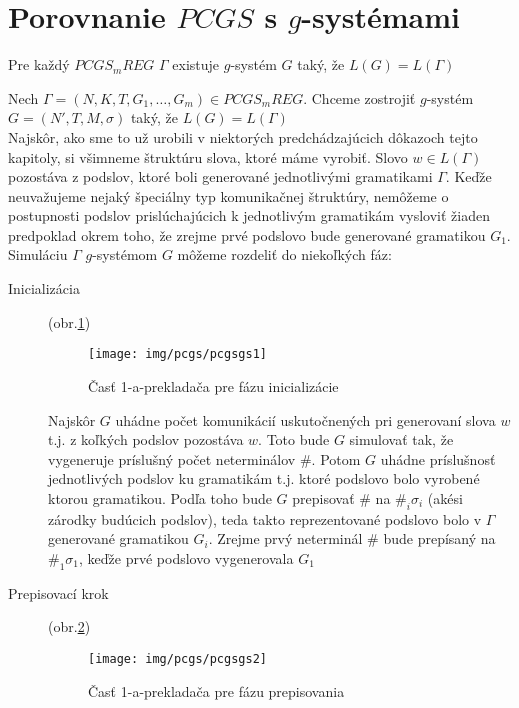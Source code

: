 \section{Porovnanie $PCGS$ s $g$-systémami}

\begin{veta}
Pre každý $PCGS_mREG$ $\Gamma$ existuje $g$-systém $G$ taký, že
$L(G)=L(\Gamma)$
\end{veta}

\begin{dokaz}
Nech $\Gamma=(N,K,T,G_1,\dots ,G_m)\in PCGS_mREG$. Chceme
zostrojiť $g$-systém $G=(N',T,M,\sigma)$ taký, že $L(G)=L(\Gamma)$
\\ Najskôr, ako sme to už urobili v niektorých predchádzajúcich
dôkazoch tejto kapitoly, si všimneme štruktúru slova, ktoré máme
vyrobiť. Slovo $w\in L(\Gamma)$ pozostáva z podslov, ktoré boli
generované jednotlivými gramatikami $\Gamma$. Keďže neuvažujeme
nejaký špeciálny typ komunikačnej štruktúry, nemôžeme o
postupnosti podslov prislúchajúcich k jednotlivým gramatikám
vysloviť žiaden predpoklad okrem toho, že zrejme prvé podslovo
bude generované gramatikou $G_1$.
\\ Simuláciu $\Gamma$ $g$-systémom $G$ môžeme rozdeliť do
niekoľkých fáz:
\begin{description}
  \item[Inicializácia] (obr.\ref{pcgsgs1})

\begin{figure}[ht]
  \centering
  \texttt{[image: img/pcgs/pcgsgs1]}
  \caption{Časť 1-a-prekladača pre fázu inicializácie}\label{pcgsgs1}
\end{figure}

  Najskôr $G$ uhádne počet komunikácií uskutočnených pri
  generovaní slova $w$ t.j. z koľkých podslov pozostáva $w$. Toto
  bude $G$ simulovať tak, že vygeneruje príslušný počet neterminálov $\#$.
  Potom $G$ uhádne príslušnosť jednotlivých podslov ku gramatikám
  t.j. ktoré podslovo bolo vyrobené ktorou gramatikou. Podľa toho
  bude $G$ prepisovať $\#$ na $\#_i\sigma_i$ (akési zárodky budúcich podslov),
  teda takto reprezentované podslovo bolo v $\Gamma$ generované gramatikou
  $G_i$. Zrejme prvý neterminál $\#$ bude prepísaný na $\#_1\sigma_1$, keďže
  prvé podslovo vygenerovala $G_1$

  \item[Prepisovací krok] (obr.\ref{pcgsgs2})
\begin{figure}[ht]
  \centering
  \texttt{[image: img/pcgs/pcgsgs2]}
  \caption{Časť 1-a-prekladača pre fázu prepisovania}\label{pcgsgs2}
\end{figure}


\end{description}
\end{dokaz}
